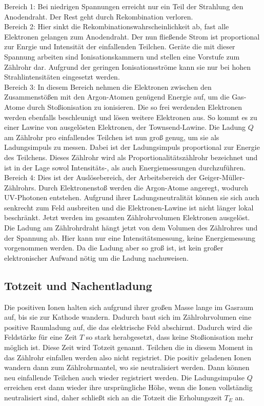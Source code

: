 Bereich 1: Bei niedrigen Spannungen erreicht nur ein Teil der Strahlung den Anodendraht.
Der Rest geht durch Rekombination verloren.\\

Bereich 2: Hier sinkt die Rekombinationswahrscheinlichkeit ab, fast alle
Elektronen gelangen zum Anodendraht. Der nun fließende Strom ist proportional
zur Enrgie und Intensität der einfallenden Teilchen. Geräte die mit dieser
Spannung arbeiten sind Ionisationskammern und stellen eine Vorstufe zum
Zählrohr dar. Aufgrund der geringen Ionisationsströme kann sie nur bei hohen
Strahlintensitäten eingesetzt werden.\\

Bereich 3: In diesem Bereich nehmen die Elektronen zwischen den Zusammenstößen mit
den Argon-Atomen genügend Energie auf, um die Gas-Atome durch Stoßionisation zu
ionisieren. Die so frei werdenden Elektronen werden ebenfalls beschleunigt und
lösen weitere Elektronen aus. So kommt es zu einer Lawine von ausgelösten
Elektronen, der Townsend-Lawine. Die Ladung $Q$ am Zählrohr pro einfallendes Teilchen ist
nun groß genug, um sie als Ladungsimpuls zu messen.
Dabei ist der Ladungsimpuls proportional zur Energie des Teilchens.
Dieses Zählrohr wird als Proportionalitätszählrohr bezeichnet und ist in der Lage
sowol Intensitäts-, als auch Energiemessungen durchzuführen.\\

Bereich 4: Dies ist der Auslösebereich, der Arbeitsbereich der Geiger-Müller-Zählrohrs.
Durch Elektronenstoß werden die Argon-Atome angeregt, wodurch UV-Photonen entstehen. Aufgrund
ihrer Ladungsneutralität können sie sich auch senkrecht zum Feld ausbreiten und die
Elektronen-Lawine ist nicht länger lokal beschränkt. Jetzt werden im gesamten
Zählrohrvolumen Elektronen ausgelöst. Die Ladung am Zählrohrdraht hängt jetzt von
dem Volumen des Zählrohres und der Spannung ab. Hier kann nur eine Intensitätsmessung, keine
Energiemessung vorgenommen werden. Da die Ladung aber so groß ist, ist kein großer
elektronischer Aufwand nötig um die Ladung nachuweisen.\\

\subsection{Totzeit und Nachentladung}
Die positiven Ionen halten sich aufgrund ihrer großen Masse lange im Gasraum auf, bis
sie zur Kathode wandern. Dadurch baut sich im Zählrohrvolumen eine positive
Raumladung auf, die das elektrische Feld abschirmt. Dadurch wird die Feldstärke
für eine Zeit $T$ so stark herabgesetzt, dass keine Stoßionisation mehr
möglich ist. Diese Zeit wird Totzeit genannt. Teilchen die in diesem Moment in das
Zählrohr einfallen werden also nicht registriet. Die positiv geladenen Ionen wandern dann
zum Zählrohrmantel, wo sie neutralisiert werden. Dann können neu einfallende Teilchen auch
wieder registriert werden. Die Ladungsimpulse $Q$ erreichen erst dann wieder ihre
ursprüngliche Höhe, wenn die Ionen vollständig neutralisiert sind, daher schließt sich an
die Totzeit die Erholungszeit $T_E$ an.

